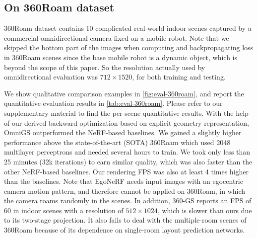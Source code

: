 \documentclass[10pt,twocolumn,letterpaper]{article}
\begin{document}
\subsection{On 360Roam dataset}
360Roam dataset\cite{nerf:360roam} contains 10 complicated real-world indoor scenes captured by a commercial omnidirectional camera fixed on a mobile robot. Note that we skipped the bottom part of the images when computing and backpropagating loss in 360Roam scenes since the base mobile robot is a dynamic object, which is beyond the scope of this paper. So the resolution actually used by omnidirectional evaluation was $712 \times 1520$, for both training and testing.

We show qualitative comparison examples in \cref{fig:eval-360roam}, and report the quantitative evaluation results in \cref{tab:eval-360roam}. Please refer to our supplementary material to find the per-scene quantitative results. With the help of our derived backward optimization based on explicit geometry representation, OmniGS outperformed the NeRF-based baselines. We gained a slightly higher performance above the state-of-the-art (SOTA) 360Roam which used 2048 multilayer perceptrons and needed several hours to train. We took only less than 25 minutes (32k iterations) to earn similar quality, which was also faster than the other NeRF-based baselines. Our rendering FPS was also at least 4 times higher than the baselines. Note that EgoNeRF needs input images with an egocentric camera motion pattern, and therefore cannot be applied on 360Roam, in which the camera roams randomly in the scenes. In addition, 360-GS \cite{3dgs:360gs} reports an FPS of 60 in indoor scenes with a resolution of $512\times 1024$, which is slower than ours due to its two-stage projection. It also fails to deal with the multiple-room scenes of 360Roam because of its dependence on single-room layout prediction networks.

\end{document}
